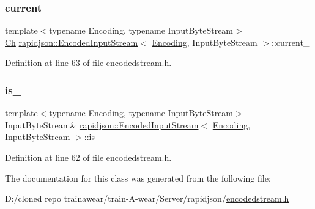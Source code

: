 \subsubsection{\texorpdfstring{current\_}{current\_}}
{\footnotesize\ttfamily template$<$typename Encoding, typename Input\+Byte\+Stream$>$ \\
\mbox{\hyperlink{classrapidjson_1_1_encoded_input_stream_ac1cf99de822b615beaa5e33ac989a20a}{Ch}} \mbox{\hyperlink{classrapidjson_1_1_encoded_input_stream}{rapidjson\+::\+Encoded\+Input\+Stream}}$<$ \mbox{\hyperlink{classrapidjson_1_1_encoding}{Encoding}}, Input\+Byte\+Stream $>$\+::current\+\_\+\hspace{0.3cm}{\ttfamily [private]}}



Definition at line 63 of file encodedstream.\+h.

\mbox{\label{classrapidjson_1_1_encoded_input_stream_a5c79d4b5cf1dd31b723f65ba9923955c}} 
\subsubsection{\texorpdfstring{is\_}{is\_}}
{\footnotesize\ttfamily template$<$typename Encoding, typename Input\+Byte\+Stream$>$ \\
Input\+Byte\+Stream\& \mbox{\hyperlink{classrapidjson_1_1_encoded_input_stream}{rapidjson\+::\+Encoded\+Input\+Stream}}$<$ \mbox{\hyperlink{classrapidjson_1_1_encoding}{Encoding}}, Input\+Byte\+Stream $>$\+::is\+\_\+\hspace{0.3cm}{\ttfamily [private]}}



Definition at line 62 of file encodedstream.\+h.



The documentation for this class was generated from the following file\+:\begin{DoxyCompactItemize}
\item 
D\+:/cloned repo trainawear/train-\/\+A-\/wear/\+Server/rapidjson/\mbox{\hyperlink{encodedstream_8h}{encodedstream.\+h}}\end{DoxyCompactItemize}
